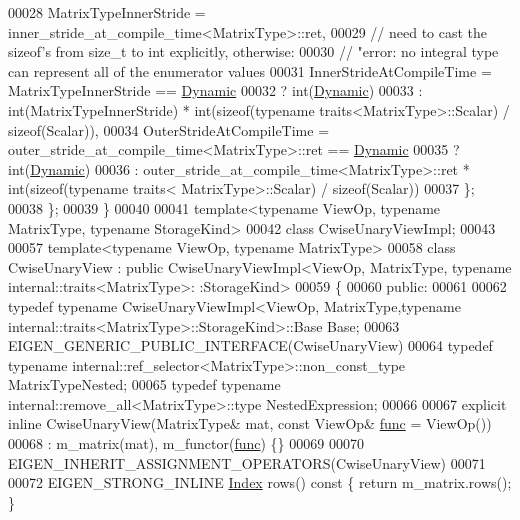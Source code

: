 \begin{DoxyCode}
00028     MatrixTypeInnerStride =  inner\_stride\_at\_compile\_time<MatrixType>::ret,
00029     \textcolor{comment}{// need to cast the sizeof's from size\_t to int explicitly, otherwise:}
00030     \textcolor{comment}{// "error: no integral type can represent all of the enumerator values}
00031     InnerStrideAtCompileTime = MatrixTypeInnerStride == \hyperlink{namespace_eigen_ad81fa7195215a0ce30017dfac309f0b2}{Dynamic}
00032                              ? \textcolor{keywordtype}{int}(\hyperlink{namespace_eigen_ad81fa7195215a0ce30017dfac309f0b2}{Dynamic})
00033                              : int(MatrixTypeInnerStride) * int(sizeof(typename traits<MatrixType>::Scalar)
       / sizeof(Scalar)),
00034     OuterStrideAtCompileTime = outer\_stride\_at\_compile\_time<MatrixType>::ret == 
      \hyperlink{namespace_eigen_ad81fa7195215a0ce30017dfac309f0b2}{Dynamic}
00035                              ? int(\hyperlink{namespace_eigen_ad81fa7195215a0ce30017dfac309f0b2}{Dynamic})
00036                              : outer\_stride\_at\_compile\_time<MatrixType>::ret * int(sizeof(typename traits<
      MatrixType>::Scalar) / sizeof(Scalar))
00037   \};
00038 \};
00039 \}
00040 
00041 \textcolor{keyword}{template}<\textcolor{keyword}{typename} ViewOp, \textcolor{keyword}{typename} MatrixType, \textcolor{keyword}{typename} StorageKind>
00042 \textcolor{keyword}{class }CwiseUnaryViewImpl;
00043 
00057 \textcolor{keyword}{template}<\textcolor{keyword}{typename} ViewOp, \textcolor{keyword}{typename} MatrixType>
00058 \textcolor{keyword}{class }CwiseUnaryView : \textcolor{keyword}{public} CwiseUnaryViewImpl<ViewOp, MatrixType, typename internal::traits<MatrixType>:
      :StorageKind>
00059 \{
00060   \textcolor{keyword}{public}:
00061 
00062     \textcolor{keyword}{typedef} \textcolor{keyword}{typename} CwiseUnaryViewImpl<ViewOp, MatrixType,typename
       internal::traits<MatrixType>::StorageKind>::Base Base;
00063     EIGEN\_GENERIC\_PUBLIC\_INTERFACE(CwiseUnaryView)
00064     \textcolor{keyword}{typedef} \textcolor{keyword}{typename} internal::ref\_selector<MatrixType>::non\_const\_type MatrixTypeNested;
00065     \textcolor{keyword}{typedef} \textcolor{keyword}{typename} internal::remove\_all<MatrixType>::type NestedExpression;
00066 
00067     \textcolor{keyword}{explicit} \textcolor{keyword}{inline} CwiseUnaryView(MatrixType& mat, \textcolor{keyword}{const} ViewOp& \hyperlink{structfunc}{func} = ViewOp())
00068       : m\_matrix(mat), m\_functor(\hyperlink{structfunc}{func}) \{\}
00069 
00070     EIGEN\_INHERIT\_ASSIGNMENT\_OPERATORS(CwiseUnaryView)
00071 
00072     EIGEN\_STRONG\_INLINE \hyperlink{namespace_eigen_a62e77e0933482dafde8fe197d9a2cfde}{Index} rows()\textcolor{keyword}{ const }\{ \textcolor{keywordflow}{return} m\_matrix.rows(); \}

\end{DoxyCode}
